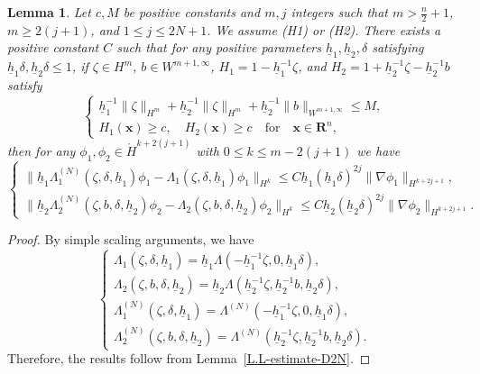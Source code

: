 \documentclass[11pt,leqno]{article}
\newtheorem{lemma}[theorem]{\bf Lemma}
\numberwithin{equation}{section}
\numberwithin{figure}{section}
\begin{document}
\begin{lemma}\label{L.res1}
Let $c, M$ be positive constants and $m, j$ integers such that $m>\frac{n}{2}+1$, $m\geq 2(j+1)$, and $1\leq j\leq 2N+1$. 
We assume {\rm (H1)} or {\rm (H2)}. 
There exists a positive constant $C$ such that for any positive parameters 
$\underline{h}_1, \underline{h}_2, \delta$ satisfying $\underline{h}_1\delta, \underline{h}_2\delta \leq 1$, 
if $\zeta\in H^m$, $b\in W^{m+1,\infty}$, $H_1 = 1 - \underline{h}_1^{-1}\zeta$, 
and $H_2 = 1 + \underline{h}_2^{-1}\zeta - \underline{h}_2^{-1}b$ satisfy 
%
\begin{equation}\label{eq-Hyp2}
\begin{cases}
 \underline{h}_1^{-1}\|\zeta\|_{H^m} + \underline{h}_2^{-1}\|\zeta\|_{H^m}
  + \underline{h}_2^{-1}\|b\|_{W^{m+1,\infty}} \leq M, \\
 H_1(\bm{x})\geq c, \quad H_2(\bm{x})\geq c \quad\mbox{for}\quad \bm{x}\in\mathbf{R}^n,
\end{cases}
\end{equation}
%
then for any $\phi_1,\phi_2 \in \mathring{H}^{k+2(j+1)}$ with $0\leq k\leq m-2(j+1)$ we have 
%
\[
\begin{cases}
 \|\underline{h}_1\Lambda_1^{(N)}(\zeta,\delta,\underline{h}_1)\phi_1
  - \Lambda_1(\zeta,\delta,\underline{h}_1)\phi_1\|_{H^k}
  \leq C \underline{h}_1(\underline{h}_1\delta)^{2j} \|\nabla \phi_1\|_{H^{k+2j+1}}, \\
 \|\underline{h}_2\Lambda_2^{(N)}(\zeta,b,\delta,\underline{h}_2)\phi_2
  - \Lambda_2(\zeta,b,\delta,\underline{h}_2)\phi_2\|_{H^k}
  \leq C \underline{h}_2(\underline{h}_2\delta)^{2j} \|\nabla \phi_2\|_{H^{k+2j+1}}.
\end{cases}
\]
\end{lemma}


\begin{proof}
By simple scaling arguments, we have 
%
\begin{equation}\label{relations-DN-B}
\begin{cases}
 \Lambda_1(\zeta,\delta,\underline{h}_1)
  = \underline{h}_1\Lambda(-\underline{h}_1^{-1}\zeta,0,\underline{h}_1\delta), \\
 \Lambda_2(\zeta,b,\delta,\underline{h}_2)
  = \underline{h}_2\Lambda(\underline{h}_2^{-1}\zeta,\underline{h}_2^{-1}b,\underline{h}_2\delta), \\
 \Lambda_1^{(N)}(\zeta,\delta,\underline{h}_1)
  = \Lambda^{(N)}(-\underline{h}_1^{-1}\zeta,0,\underline{h}_1\delta), \\
 \Lambda_2^{(N)}(\zeta,b,\delta,\underline{h}_2)
  = \Lambda^{(N)}(\underline{h}_2^{-1}\zeta,\underline{h}_2^{-1}b,\underline{h}_2\delta).
\end{cases}
\end{equation}
%
Therefore, the results follow from Lemma~\ref{L.L-estimate-D2N}. 
\end{proof}
\end{document}
